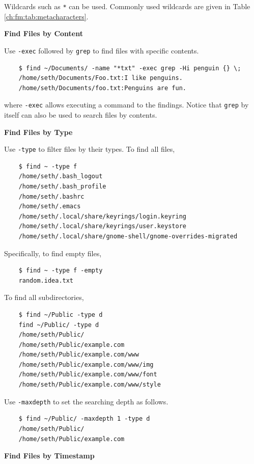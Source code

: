 Wildcards such as \verb|*| can be used. Commonly used wildcards are given in Table \ref{ch:fm:tab:metacharacters}.

\vspace{0.1in}
\noindent \textbf{Find Files by Content}
\vspace{0.1in}

Use \verb|-exec| followed by \verb|grep| to find files with specific contents.
\begin{lstlisting}
	$ find ~/Documents/ -name "*txt" -exec grep -Hi penguin {} \;
	/home/seth/Documents/Foo.txt:I like penguins.
	/home/seth/Documents/foo.txt:Penguins are fun.
\end{lstlisting}
where \verb|-exec| allows executing a command to the findings. Notice that \verb|grep| by itself can also be used to search files by contents.

\vspace{0.1in}
\noindent \textbf{Find Files by Type}
\vspace{0.1in}

Use \verb|-type| to filter files by their types. To find all files,
\begin{lstlisting}
	$ find ~ -type f
	/home/seth/.bash_logout
	/home/seth/.bash_profile
	/home/seth/.bashrc
	/home/seth/.emacs
	/home/seth/.local/share/keyrings/login.keyring
	/home/seth/.local/share/keyrings/user.keystore
	/home/seth/.local/share/gnome-shell/gnome-overrides-migrated
\end{lstlisting}
Specifically, to find empty files,
\begin{lstlisting}
	$ find ~ -type f -empty
	random.idea.txt
\end{lstlisting}

To find all subdirectories,
\begin{lstlisting}
	$ find ~/Public -type d
	find ~/Public/ -type d
	/home/seth/Public/
	/home/seth/Public/example.com
	/home/seth/Public/example.com/www
	/home/seth/Public/example.com/www/img
	/home/seth/Public/example.com/www/font
	/home/seth/Public/example.com/www/style
\end{lstlisting}

Use \verb|-maxdepth| to set the searching depth as follows.
\begin{lstlisting}
	$ find ~/Public/ -maxdepth 1 -type d
	/home/seth/Public/
	/home/seth/Public/example.com
\end{lstlisting}

\vspace{0.1in}
\noindent \textbf{Find Files by Timestamp}
\vspace{0.1in}


